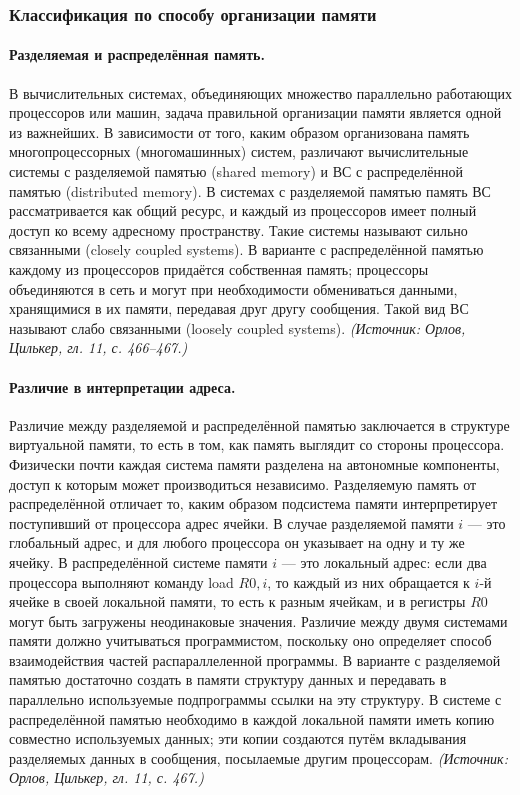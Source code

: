 \documentclass[a4paper,12pt]{article}
\begin{document}
\subsubsection{Классификация по способу организации памяти}

\paragraph{Разделяемая и распределённая память.}
В вычислительных системах, объединяющих множество параллельно работающих процессоров или машин, задача правильной организации памяти является одной из важнейших. В зависимости от того, каким образом организована память многопроцессорных (многомашинных) систем, различают вычислительные системы с разделяемой памятью (shared memory) и ВС с распределённой памятью (distributed memory). В системах с разделяемой памятью память ВС рассматривается как общий ресурс, и каждый из процессоров имеет полный доступ ко всему адресному пространству. Такие системы называют сильно связанными (closely coupled systems). В варианте с распределённой памятью каждому из процессоров придаётся собственная память; процессоры объединяются в сеть и могут при необходимости обмениваться данными, хранящимися в их памяти, передавая друг другу сообщения. Такой вид ВС называют слабо связанными (loosely coupled systems).
\textit{(Источник: Орлов, Цилькер, гл. 11, с. 466--467.)}

\paragraph{Различие в интерпретации адреса.}
Различие между разделяемой и распределённой памятью заключается в структуре виртуальной памяти, то есть в том, как память выглядит со стороны процессора. Физически почти каждая система памяти разделена на автономные компоненты, доступ к которым может производиться независимо. Разделяемую память от распределённой отличает то, каким образом подсистема памяти интерпретирует поступивший от процессора адрес ячейки. В случае разделяемой памяти \(i\) — это глобальный адрес, и для любого процессора он указывает на одну и ту же ячейку. В распределённой системе памяти \(i\) — это локальный адрес: если два процессора выполняют команду load \(R0, i\), то каждый из них обращается к \(i\)-й ячейке в своей локальной памяти, то есть к разным ячейкам, и в регистры \(R0\) могут быть загружены неодинаковые значения. Различие между двумя системами памяти должно учитываться программистом, поскольку оно определяет способ взаимодействия частей распараллеленной программы. В варианте с разделяемой памятью достаточно создать в памяти структуру данных и передавать в параллельно используемые подпрограммы ссылки на эту структуру. В системе с распределённой памятью необходимо в каждой локальной памяти иметь копию совместно используемых данных; эти копии создаются путём вкладывания разделяемых данных в сообщения, посылаемые другим процессорам.
\textit{(Источник: Орлов, Цилькер, гл. 11, с. 467.)}
\end{document}
